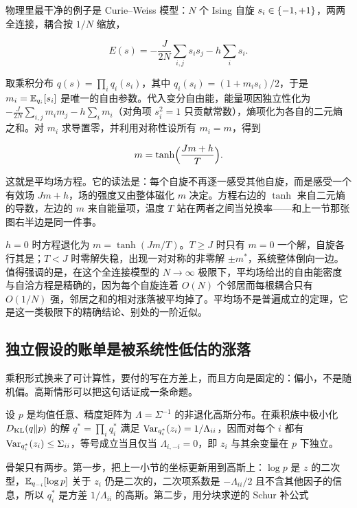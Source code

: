 物理里最干净的例子是 Curie--Weiss 模型：\(N\) 个 Ising 自旋 \(s_i\in\left\{-1,+1\right\}\)，两两全连接，耦合按 \(1/N\) 缩放，

\[
E(s)=-\frac{J}{2N}\sum_{i,j}s_is_j-h\sum_i s_i.
\]

取乘积分布 \(q(s)=\prod_i q_i(s_i)\)，其中 \(q_i(s_i)=(1+m_is_i)/2\)，于是 \(m_i=\mathbb{E}_{q_i}[s_i]\) 是唯一的自由参数。代入变分自由能，能量项因独立性化为 \(-\frac{J}{2N}\sum_{i,j}m_im_j-h\sum_i m_i\)（对角项 \(s_i^2=1\) 只贡献常数），熵项化为各自的二元熵之和。对 \(m_i\) 求导置零，并利用对称性设所有 \(m_i=m\)，得到

\[
m=\tanh\Bigl(\frac{Jm+h}{T}\Bigr).
\]

这就是平均场方程。它的读法是：每个自旋不再逐一感受其他自旋，而是感受一个有效场 \(Jm+h\)，场的强度又由整体磁化 \(m\) 决定。方程右边的 \(\tanh\) 来自二元熵的导数，左边的 \(m\) 来自能量项，温度 \(T\) 站在两者之间当兑换率——和上一节那张图右半边是同一件事。

\(h=0\) 时方程退化为 \(m=\tanh(Jm/T)\)。\(T\ge J\) 时只有 \(m=0\) 一个解，自旋各行其是；\(T<J\) 时零解失稳，出现一对对称的非零解 \(\pm m^{*}\)，系统整体倒向一边。值得强调的是，在这个全连接模型的 \(N\to\infty\) 极限下，平均场给出的自由能密度与自洽方程是精确的，因为每个自旋连着 \(O(N)\) 个邻居而每根耦合只有 \(O(1/N)\) 强，邻居之和的相对涨落被平均掉了。平均场不是普遍成立的定理，它是这一类极限下的精确结论、别处的一阶近似。

\subsection{独立假设的账单是被系统性低估的涨落}

乘积形式换来了可计算性，要付的写在方差上，而且方向是固定的：偏小，不是随机偏。高斯情形可以把这句话证成一条命题。

\begin{proposition}
设 \(p\) 是均值任意、精度矩阵为 \(\Lambda=\Sigma^{-1}\) 的非退化高斯分布。在乘积族中极小化 \(D_{\mathrm{KL}}(q\|p)\) 的解 \(q^{*}=\prod_i q_i^{*}\) 满足 \(\operatorname{Var}_{q_i^{*}}(z_i)=1/\Lambda_{ii}\)，因而对每个 \(i\) 都有 \(\operatorname{Var}_{q_i^{*}}(z_i)\le\Sigma_{ii}\)，等号成立当且仅当 \(\Lambda_{i,-i}=0\)，即 \(z_i\) 与其余变量在 \(p\) 下独立。
\end{proposition}

骨架只有两步。第一步，把上一小节的坐标更新用到高斯上：\(\log p\) 是 \(z\) 的二次型，\(\mathbb{E}_{q_{-i}}[\log p]\) 关于 \(z_i\) 仍是二次的，二次项系数是 \(-\Lambda_{ii}/2\) 且不含其他因子的信息，所以 \(q_i^{*}\) 是方差 \(1/\Lambda_{ii}\) 的高斯。第二步，用分块求逆的 Schur 补公式

